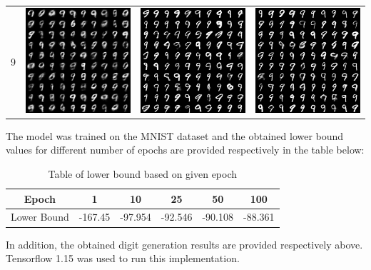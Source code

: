 \documentclass[12pt,a4paper]{article}
\begin{document}
\begin{table}
\begin{tabular}{cccc}
			9 & \includegraphics[width=4cm]{Figures/Epoch1_Label9} & \includegraphics[width=4cm]{Figures/Epoch50_Label9} & \includegraphics[width=4cm]{Figures/Epoch100_Label9}
		\end{tabular}
	\end{table}

\noindent The model was trained on the MNIST dataset and the obtained lower bound values for different number of epochs are provided respectively in the table below:
\begin{table}[H]
	\centering
	\begin{tabular}{|c|c|c|c|c|c|}
		\hline
		Epoch & 1& 10& 25& 50& 100\\\hline
		Lower Bound & -167.45& -97.954& -92.546&-90.108& -88.361\\
		\hline
	\end{tabular}
	\caption{Table of lower bound based on given epoch}
\end{table}

\noindent In addition, the obtained digit generation results are provided respectively above. Tensorflow 1.15 was used to run this implementation.
\end{document}
